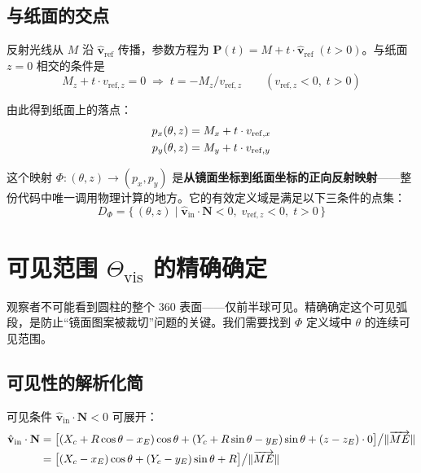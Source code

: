 \documentclass[12pt,a4paper]{ctexart}
\begin{document}
\subsection{与纸面的交点}

反射光线从 $M$ 沿 $\hat{\mathbf{v}}_{\mathrm{ref}}$ 传播，参数方程为 $\mathbf{P}(t)=M+t\cdot\hat{\mathbf{v}}_{\mathrm{ref}}\;(t>0)$。与纸面 $z=0$ 相交的条件是
\begin{equation}
    M_z + t\cdot v_{\mathrm{ref},z} = 0 \;\Longrightarrow\; t = -M_z/v_{\mathrm{ref},z}\qquad(v_{\mathrm{ref},z}<0,\;t>0)
\end{equation}

由此得到纸面上的落点：
\begin{align}
    p_x(\theta,z) &= M_x + t\cdot v_{\mathrm{ref},x} \notag\\
    p_y(\theta,z) &= M_y + t\cdot v_{\mathrm{ref},y} \label{eq:mapping}
\end{align}

这个映射 $\Phi: (\theta,z)\to(p_x,p_y)$ 是\textbf{从镜面坐标到纸面坐标的正向反射映射}——整份代码中唯一调用物理计算的地方。它的有效定义域是满足以下三条件的点集：
\begin{equation}
    D_{\Phi} = \{\, (\theta,z) \mid \hat{\mathbf{v}}_{\mathrm{in}}\cdot\mathbf{N}<0,\; v_{\mathrm{ref},z}<0,\; t>0 \,\}
\end{equation}

\section{可见范围 $\Theta_{\mathrm{vis}}$ 的精确确定}

观察者不可能看到圆柱的整个 360\textdegree{} 表面——仅前半球可见。精确确定这个可见弧段，是防止``镜面图案被裁切''问题的关键。我们需要找到 $\Phi$ 定义域中 $\theta$ 的连续可见范围。

\subsection{可见性的解析化简}

可见条件 $\hat{\mathbf{v}}_{\mathrm{in}}\cdot\mathbf{N}<0$ 可展开：
\begin{align}
    \hat{\mathbf{v}}_{\mathrm{in}}\cdot\mathbf{N}
    &= \bigl[ (X_c+R\cos\theta-x_E)\cos\theta + (Y_c+R\sin\theta-y_E)\sin\theta + (z-z_E)\cdot 0 \bigr] \big/ \|\overrightarrow{ME}\| \notag\\
    &= \bigl[ (X_c-x_E)\cos\theta + (Y_c-y_E)\sin\theta + R \bigr] \big/ \|\overrightarrow{ME}\| \label{eq:visibility}
\end{align}
\end{document}
